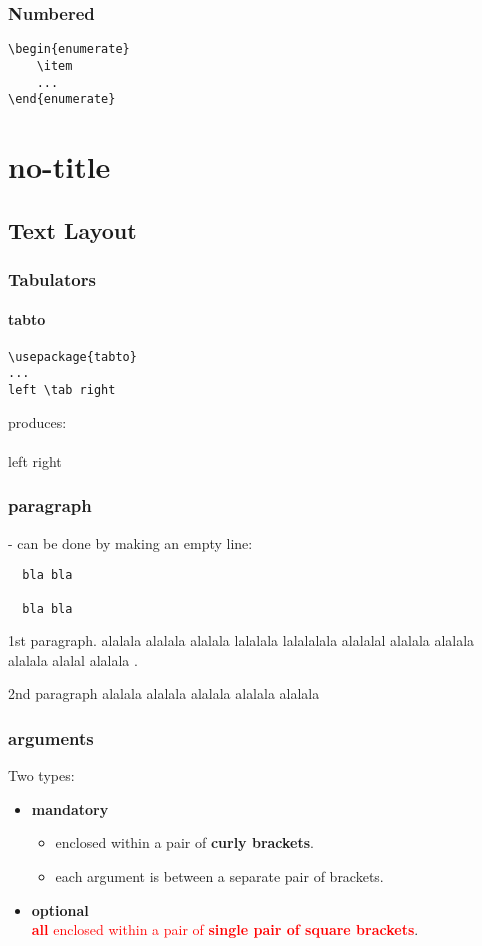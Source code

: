 \documentclass{report}
\begin{document}
\section{Numbered}	
\begin{verbatim}
\begin{enumerate}
    \item 
    ...
\end{enumerate}
\end{verbatim}


\part{no-title}



\chapter{Text Layout}


\section{Tabulators}

\subsection{tabto}
\begin{verbatim}
\usepackage{tabto}
...
left \tab right
\end{verbatim}
produces:\\
\\
left \tab right

\section{paragraph} - can be done by making an empty line:

\begin{verbatim}
  bla bla

  bla bla
\end{verbatim}

1st paragraph. alalala alalala alalala lalalala lalalalala alalalal alalala alalala alalala alalal alalala .

2nd paragraph alalala alalala alalala alalala alalala 

\section{arguments}
Two types:
\begin{itemize}
	\item \textbf{mandatory}
	\begin{itemize}
		\item 	enclosed within a pair of \textbf{curly brackets}.
		\item each argument is between a separate pair of brackets.
	\end{itemize}

	\item \textbf{optional}\\
	\textcolor{red}{\textbf{all} enclosed within a pair of \textbf{single pair of square brackets}}.
\end{itemize}
\end{document}

